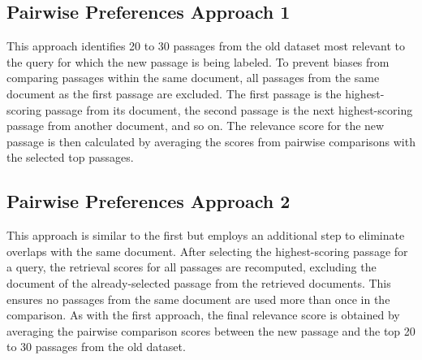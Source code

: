 \subsection{Pairwise Preferences Approach 1}\label{pairwise-preferences-approach-1}

This approach identifies 20 to 30 passages from the old dataset most relevant to the query for which the new passage is being labeled. To prevent biases from comparing passages within the same document, all passages from the same document as the first passage are excluded. The first passage is the highest-scoring passage from its document, the second passage is the next highest-scoring passage from another document, and so on. The relevance score for the new passage is then calculated by averaging the scores from pairwise comparisons with the selected top passages.

\subsection{Pairwise Preferences Approach 2}\label{pairwise-preferences-approach-2}

This approach is similar to the first but employs an additional step to eliminate overlaps with the same document. After selecting the highest-scoring passage for a query, the retrieval scores for all passages are recomputed, excluding the document of the already-selected passage from the retrieved documents. This ensures no passages from the same document are used more than once in the comparison. As with the first approach, the final relevance score is obtained by averaging the pairwise comparison scores between the new passage and the top 20 to 30 passages from the old dataset.